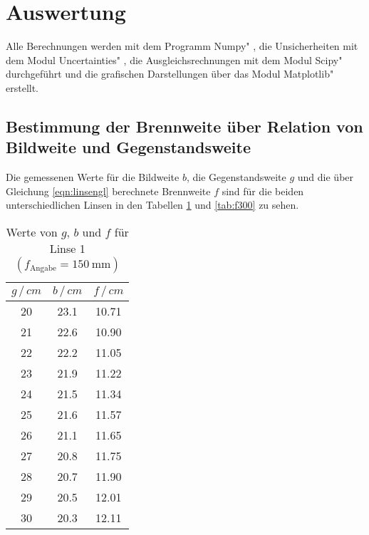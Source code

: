 \section{Auswertung}
\label{sec:Auswertung}
Alle Berechnungen werden mit dem Programm \glqq Numpy" \cite{numpy}, die Unsicherheiten mit dem Modul \glqq Uncertainties" \cite{uncertainties}, die Ausgleichsrechnungen mit dem Modul \glqq Scipy" \cite{scipy} durchgeführt und die grafischen Darstellungen über das Modul \glqq Matplotlib" \cite{matplotlib} erstellt.

\subsection{Bestimmung der Brennweite über Relation von Bildweite und Gegenstandsweite}

Die gemessenen Werte für die Bildweite $b$, die Gegenstandsweite $g$ und die über Gleichung \ref{eqn:linsengl} 
berechnete Brennweite $f$ sind für die beiden unterschiedlichen Linsen in den Tabellen \ref{tab:f150} und \ref{tab:f300} zu sehen.

\begin{table}
    \centering
    \caption{Werte von $g$, $b$ und $f$ für Linse 1 $(f_\text{Angabe}=\SI{150}{\mm})$}
    \begin{tabular}{c c c}
    \toprule
    $g\,/\,cm$ & $b\,/\,cm$ & $f\,/\,cm$ \\
    \midrule
    20 & 23.1 & 10.71 \\
    21 & 22.6 & 10.90 \\
    22 & 22.2 & 11.05 \\
    23 & 21.9 & 11.22 \\
    24 & 21.5 & 11.34 \\
    25 & 21.6 & 11.57 \\
    26 & 21.1 & 11.65 \\
    27 & 20.8 & 11.75 \\
    28 & 20.7 & 11.90 \\
    29 & 20.5 & 12.01 \\
    30 & 20.3 & 12.11 \\
    \bottomrule
    \end{tabular}
    \label{tab:f150}
\end{table}

